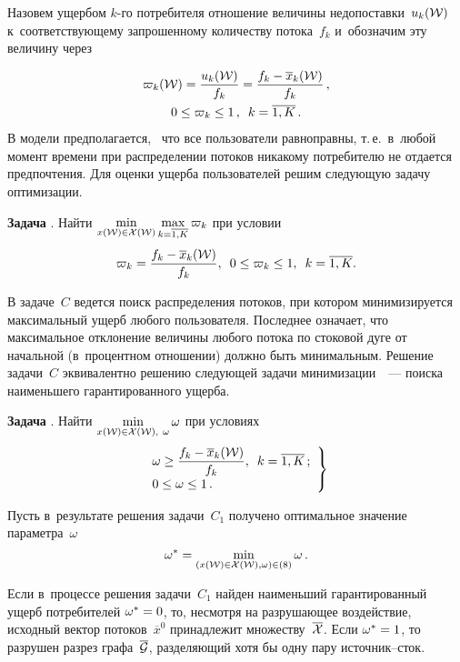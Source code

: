 \begin{multicols}{2}
Назовем  ущербом  $k$-го потребителя отношение величины недопоставки~$u_k({\cal W}) $ 
к~соответствующему  запрошенному количеству потока~$f_k$ и~обозначим эту величину 
через

\noindent
\begin{multline*}
\varpi_k({\cal W}) = \displaystyle\frac{\displaystyle u_k({\cal W})\mathstrut}{\displaystyle f_k\mathstrut}= \displaystyle\frac{\displaystyle f_k - \overline x_k({\cal W})\mathstrut}{\displaystyle f_k\mathstrut}\,,\\
0 \le  \varpi_k \le 1\,,  \enskip k = \overline{1, K}\,.
\end{multline*}
В модели предполагается, \ что все пользователи 
равноправны, т.\,е.\ в~любой момент времени при распределении потоков никакому 
потребителю не отдается предпочтения.
Для оценки ущерба пользователей  решим следующую  задачу оптимизации.

\smallskip

\noindent
\textbf{Задача} {}. Найти
$\min\limits_{x({\cal W}) \in {\cal X}({\cal W})} \max\limits_{k = \overline{1, K}} 
\varpi_{k} $
при условии
$$
\varpi_{k} = \displaystyle\frac{\displaystyle f_{k} - \overline x_{k}({\cal W})\mathstrut}{\displaystyle f_{k}\mathstrut}, \enskip
 0 \le \varpi_k \le 1, \enskip k = \overline{1, K}.  
 $$

В задаче~$C$ ведется поиск распределения потоков, при котором минимизируется 
максимальный ущерб любого пользователя. Последнее означает, что максимальное 
отклонение величины любого потока по стоковой дуге от начальной 
(в~процентном отношении) должно быть минимальным.
Решение задачи~$C$ эквивалентно решению следующей задачи минимизации~\cite{Dan}~--- 
поиска наименьшего гарантированного ущерба.

\smallskip

\noindent
\textbf{Задача} {}.   Найти
$\min\limits_ {x({\cal W}) \in {\cal X}({\cal W}), \ \omega} \omega $
при условиях
\begin{equation}
 \left.  
 \begin{array}{l}
\displaystyle \omega \geq \displaystyle\frac{\displaystyle f_k - \overline x_k({\cal W})\mathstrut}{\displaystyle f_k\mathstrut}, \enskip
 k = \overline{1, K}\,;\\[6pt]
0 \le \omega \le 1\,. 
                    \end{array}
 \right \}
 \label{e8-mal}
 \end{equation}
 
Пусть в~результате решения задачи~$C_1$ получено оптимальное значение 
параметра~$\omega$
$$
 \omega ^{*} = \min\limits_{(x({\cal W}) 
 \in {\cal X}({\cal W}), \omega) \in (8)}\omega \,. 
 $$

Если в~процессе решения задачи~$C_1$ найден наименьший гарантированный ущерб
 потребителей $\omega^* \hm= 0$, то, несмотря на разрушающее воздействие, 
 исходный  вектор потоков~$\overline x^0$ принадлежит множеству~$\overline{{\cal X}}$. 
 Если $\omega^* \hm= 1$, то разрушен разрез графа~$\overline{{\cal G}}$, 
 разделяющий хотя бы одну пару ис\-точ\-ник--сток. 
 

\end{multicols}
